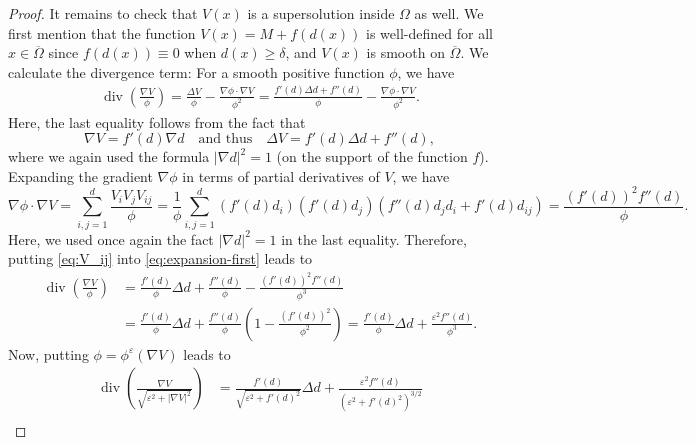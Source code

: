 \documentclass[11pt]{article}
\numberwithin{equation}{section}
\newcommand{\fix}[1]{\textcolor{red}{#1}}
\def\geq{\geqslant}
\begin{document}
\begin{proof}
It remains to check that $V(x)$ is a supersolution inside $\Omega$ as well.
We first mention that the function $V(x) = M + f(d(x))$ is well-defined for all $x\in\overline{\Omega}$ since $f(d(x))\equiv0$ when $d(x)\geq\delta$, and $V(x)$ is smooth on $\overline{\Omega}$.
We calculate the divergence term: For a smooth positive function $\phi$, we have
\begin{align}\label{eq:expansion-first}
\operatorname{div}\left(\frac{\nabla V}{\phi}\right) = \frac{\Delta V}{\phi} - \frac{\nabla\phi\cdot\nabla V}{\phi^2} = \frac{f'(d)\Delta d + f''(d)}{\phi} - \frac{\nabla\phi\cdot\nabla V}{\phi^2}.
\end{align}
Here, the last equality follows from the fact that
\[
\nabla V=f'(d)\nabla d\quad\text{and thus}\quad \Delta V = f'(d)\Delta d + f''(d),
\]
where we again used the formula $|\nabla d|^2=1$ (on the support of the function $f$). Expanding the gradient $\nabla \phi$ in terms of partial derivatives of $V$, we have
\begin{equation}\label{eq:V_ij}
\nabla \phi \cdot \nabla V = \sum_{i,j = 1}^d\frac{V_iV_jV_{ij}}{\phi} = \frac{1}{\phi} \sum_{i,j=1}^d (f'(d) d_i)(f'(d) d_j)(f''(d) d_j d_i + f'(d) d_{ij}) = \frac{(f'(d))^2f''(d)}{\phi}.
\end{equation}
Here, we used once again the fact $|\nabla d|^2=1$ in the last equality. Therefore, putting \eqref{eq:V_ij} into \eqref{eq:expansion-first} leads to
\begin{align*}
\operatorname{div}\left(\frac{\nabla V}{\phi}\right) &= \frac{f'(d)}{\phi}\Delta d + \frac{f''(d)}{\phi} - \frac{(f'(d))^2f''(d)}{\phi^3}\\
&= \frac{f'(d)}{\phi}\Delta d + \frac{f''(d)}{\phi}\left(1-\frac{(f'(d))^2}{\phi^2}\right) = \frac{f'(d)}{\phi}\Delta d + \frac{\varepsilon^2f''(d)}{\phi^3}.
\end{align*}
\noindent
Now, putting $\phi = \phi^\varepsilon(\nabla V)$ leads to
\begin{align*}
\operatorname{div} \left( \frac{\nabla V}{\sqrt{\varepsilon^2 + |\nabla V|^2}} \right) &= \frac{f'(d)}{\sqrt{\varepsilon^2 + f'(d)^2}} \Delta d + \frac{\varepsilon^2 f''(d)}{\left(\varepsilon^2 + f'(d)^2\right)^{3/2}}  \\

\end{align*}
\end{proof}
\end{document}
